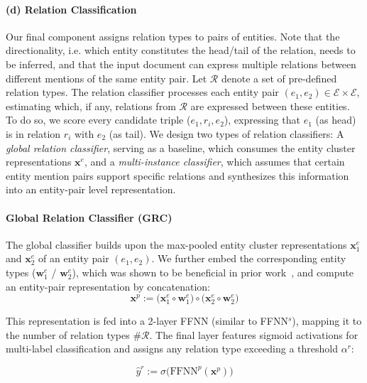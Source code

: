 \documentclass[11pt,a4paper]{article}
\begin{document}
\paragraph{(d) Relation Classification}
Our final component assigns relation types to pairs of entities.
Note that the directionality, i.e. which entity constitutes the head/tail of the relation, needs to be inferred, and that the input document can express multiple relations between different mentions of the same entity pair. Let $\mathcal{R}$ denote a set of pre-defined relation types. The relation classifier processes each entity pair $(e_1, e_2) \in \mathcal{E} {\times} \mathcal{E}$, estimating which, if any, relations from $\mathcal{R}$ are expressed between these entities. To do so, we score every candidate triple ($e_1{,} r_i{,} e_2$), expressing that $e_1$ (as head) is in relation $r_i$ with $e_2$ (as tail).  We design two types of relation classifiers: A \emph{global relation classifier}, serving as a baseline, which consumes the entity cluster representations $\mathbf{x}^e$, and a \emph{multi-instance classifier}, which assumes that certain entity mention pairs support specific relations and synthesizes this information into an entity-pair level representation.

\paragraph{Global Relation Classifier (GRC)} The global classifier builds upon the max-pooled entity cluster representations $\mathbf{x}_1^e$ and $\mathbf{x}_2^e$ of an entity pair $(e_1, e_2)$. We further embed the corresponding entity types ($\mathbf{w}_1^e$ / $\mathbf{w}_2^e$), which was shown to be beneficial in prior work~\cite{yao:2019:docred}, and compute an entity-pair representation by concatenation:
\begin{equation} \label{eq:entitypairrepr}
\mathbf{x}^p := \Big( \mathbf{x}_1^e \circ \mathbf{w}_1^e \Big) \circ \Big( \mathbf{x}_2^e \circ \mathbf{w}_2^e \Big)
\end{equation}

This representation is fed into a 2-layer FFNN (similar to FFNN$^s$), mapping it to the number of relation types $\#\mathcal{R}$. The final layer features sigmoid activations for multi-label classification and assigns any relation type exceeding a threshold $\alpha^r$:

\begin{equation}
\label{eq:globalrelclassifier}    \hat{y}^r := \sigma \Big( \text{FFNN}^p(\mathbf{x}^p) \Big)
\end{equation}
\end{document}
